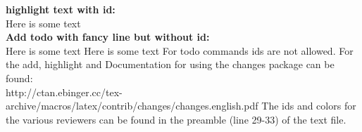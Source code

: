 \documentclass[11pt, showtrims, final, oldfontcommands]{memoir}
\begin{document}
\textbf{highlight text with id:}\\
Here is some text
\\

\textbf{Add todo with fancy line but without id:}\\
Here is some text 
 Here is some text
\newline 
\newline
\newline
\newline 
\newline
\newline
For todo commands ids are not allowed. For the add, highlight and
Documentation for using the changes package can be found:\\
http://ctan.ebinger.cc/tex-archive/macros/latex/contrib/changes/changes.english.pdf
\newline
The ids and colors for the various reviewers can be found in the preamble (line 29-33) of the text file.
\end{document}
